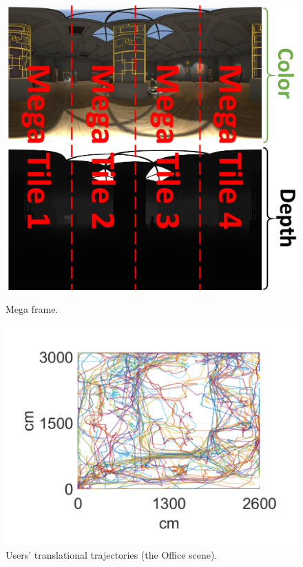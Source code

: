 \begin{figure}[t]
	\centering
	\begin{minipage}{.4\textwidth}
		\centering
		\includegraphics[width=\linewidth]{figs/firefly/MT.pdf}
		\vspace{-.1in}
		\caption{\small Mega frame.}
		\label{fig:mf}
	\end{minipage}
	\begin{minipage}{.5\textwidth}
		\centering
		\includegraphics[width=\linewidth]{figs/firefly/office_trajectory.pdf} \vspace{-.25in}
		\caption{\small Users' translational trajectories (the Office scene).}
		\label{fig:office_trajectory}
	\end{minipage}
\end{figure}

